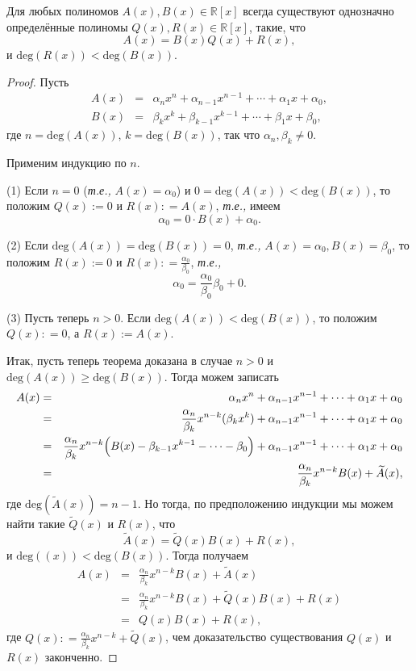 \begin{theorem}\label{div_of_polynmials}
 Для любых полиномов $A(x), B(x) \in \mathbb{R}[x]$ всегда существуют однозначно определённые полиномы $Q(x), R(x) \in \mathbb{R}[x]$, такие, что
 \[
  A(x) = B(x) Q(x) + R(x),
 \]
 и $\mathrm{deg}(R(x)) < \mathrm{deg}(B(x)).$
\end{theorem}
\begin{proof}
    Пусть
    \begin{eqnarray*}
        A(x) &=& \alpha_nx^n + \alpha_{n-1}x^{n-1} + \cdots + \alpha_1x + \alpha_0, \\
        B(x) &=& \beta_kx^k + \beta_{k-1}x^{k-1} + \cdots + \beta_1x + \beta_0,
    \end{eqnarray*}
где $n = \mathrm{deg}(A(x))$, $k = \mathrm{deg}(B(x))$, так что $\alpha_n, \beta_k \ne 0$.

Применим индукцию по $n$.

(1) Если $n =0$ (\textit{т.е.,} $A(x) = \alpha_0$) и $0=\mathrm{deg}(A(x)) < \mathrm{deg}(B(x))$, то положим $Q(x):=0$ и $R(x) : = A(x)$, \textit{т.е.,} имеем
\[
 \alpha_0 = 0 \cdot B(x) + \alpha_0.
\]

(2) Если $\mathrm{deg}(A(x)) = \mathrm{deg}(B(x)) = 0$, \textit{т.е.,} $A(x) = \alpha_0, B(x) = \beta_0$, то положим $R(x) :=0$ и $R(x): = \frac{\alpha_0}{\beta_0}$, \textit{т.е.,}
\[
 \alpha_0 = \frac{\alpha_0}{\beta_0} \beta_0 +0.
\]

(3) Пусть теперь $n>0$. Если $\mathrm{deg}(A(x)) < \mathrm{deg}(B(x))$, то положим $Q(x) : = 0$, а $R(x):=A(x).$

Итак, пусть теперь теорема доказана в случае $n>0$ и $\mathrm{deg}(A(x)) \ge \mathrm{deg}(B(x))$. Тогда можем записать
\begin{eqnarray*}
    A(x) &=& \alpha_nx^n + \alpha_{n-1}x^{n-1} + \cdots + \alpha_1x + \alpha_0 \\
    &=& \frac{\alpha_n}{\beta_k} x^{n-k} (\beta_k x^k) + \alpha_{n-1}x^{n-1} + \cdots + \alpha_1x + \alpha_0 \\
    &=& \frac{\alpha_n}{\beta_k} x^{n-k} \Bigl( B(x) - \beta_{k-1}x^{k-1} - \cdots - \beta_0  \Bigr) + \alpha_{n-1}x^{n-1} + \cdots + \alpha_1x + \alpha_0 \\
    &=&  \frac{\alpha_n}{\beta_k}x^{n-k} B(x) + \widetilde{A}(x),
\end{eqnarray*}
где $\mathrm{deg}(\widetilde{A}(x)) = n-1.$ Но тогда, по предположению индукции мы можем найти такие $\widetilde{Q}(x)$ и ${R}(x)$, что
\[
 \widetilde{A}(x) = \widetilde{Q}(x)B(x) + {R}(x),
\]
и $\mathrm{deg}((x))< \mathrm{deg}(B(x))$. Тогда получаем
\begin{eqnarray*}
    A(x) &=& \frac{\alpha_n}{\beta_k}x^{n-k} B(x) + \widetilde{A}(x) \\
    &=& \frac{\alpha_n}{\beta_k}x^{n-k} B(x) + \widetilde{Q}(x)B(x) + {R}(x)\\
    &=& Q(x) B(x) + R(x),
\end{eqnarray*}
где $Q(x): = \frac{\alpha_n}{\beta_k}x^{n-k} + \widetilde{Q}(x)$, чем доказательство существования $Q(x)$ и $R(x)$ законченно.


\end{proof}
